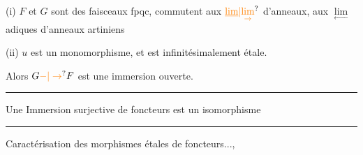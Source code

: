 


(i) $F$ et $G$ sont des faisceaux fpqc, commutent aux $\unsure{\underline{\lim}|\underset{\rightarrow}{\lim}}$ d'anneaux, aux $\underset{\leftarrow}{\lim}$ adiques d'anneaux artiniens

(ii) $u$ est un monomorphisme, et est infinitésimalement étale.


Alors $G\unsure{\mathbin{-}|\to}F$ est une immersion ouverte.

\noindent\rule{.35\linewidth}{.4pt}

Une Immersion  surjective de foncteurs est un isomorphisme

\noindent\rule{.39\linewidth}{.4pt}

Caractérisation des morphismes étales de foncteurs...,


